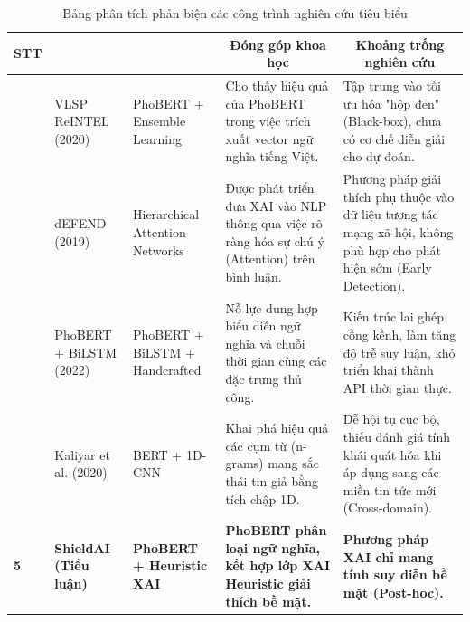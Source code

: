 \documentclass[12pt,a4paper]{article}
\begin{document}
\begin{table}[H]
\centering
\small
\caption{Bảng phân tích phản biện các công trình nghiên cứu tiêu biểu}
\label{tab:so_sanh_nghien_cuu}
\begin{tabularx}{\textwidth}{|>{\centering\arraybackslash}p{0.8cm}|>{\raggedright\arraybackslash}X|>{\raggedright\arraybackslash}X|X|X|}
\hline
\textbf{STT} & \multicolumn{1}{c|}{\textbf{Công trình}} & \multicolumn{1}{c|}{\textbf{Phương pháp tiếp cận}} & \multicolumn{1}{c|}{\textbf{Đóng góp khoa học}} & \multicolumn{1}{c|}{\textbf{Khoảng trống nghiên cứu}} \\
\hline
1 & VLSP ReINTEL (2020) & PhoBERT + Ensemble Learning & Cho thấy hiệu quả của PhoBERT trong việc trích xuất vector ngữ nghĩa tiếng Việt. & Tập trung vào tối ưu hóa "hộp đen" (Black-box), chưa có cơ chế diễn giải cho dự đoán. \\
\hline
2 & dEFEND (2019) & Hierarchical Attention Networks & Được phát triển đưa XAI vào NLP thông qua việc rõ ràng hóa sự chú ý (Attention) trên bình luận. & Phương pháp giải thích phụ thuộc vào dữ liệu tương tác mạng xã hội, không phù hợp cho phát hiện sớm (Early Detection). \\
\hline
3 & PhoBERT + BiLSTM (2022) & PhoBERT + BiLSTM + Handcrafted & Nỗ lực dung hợp biểu diễn ngữ nghĩa và chuỗi thời gian cùng các đặc trưng thủ công. & Kiến trúc lai ghép cồng kềnh, làm tăng độ trễ suy luận, khó triển khai thành API thời gian thực. \\
\hline
4 & Kaliyar et al. (2020) & BERT + 1D-CNN & Khai phá hiệu quả các cụm từ (n-grams) mang sắc thái tin giả bằng tích chập 1D. & Dễ hội tụ cục bộ, thiếu đánh giá tính khái quát hóa khi áp dụng sang các miền tin tức mới (Cross-domain). \\
\hline
\textbf{5} & \textbf{ShieldAI (Tiểu luận)} & \textbf{PhoBERT + Heuristic XAI} & \textbf{PhoBERT phân loại ngữ nghĩa, kết hợp lớp XAI Heuristic giải thích bề mặt.} & \textbf{Phương pháp XAI chỉ mang tính suy diễn bề mặt (Post-hoc).} \\
\hline
\end{tabularx}
\end{table}
\end{document}
